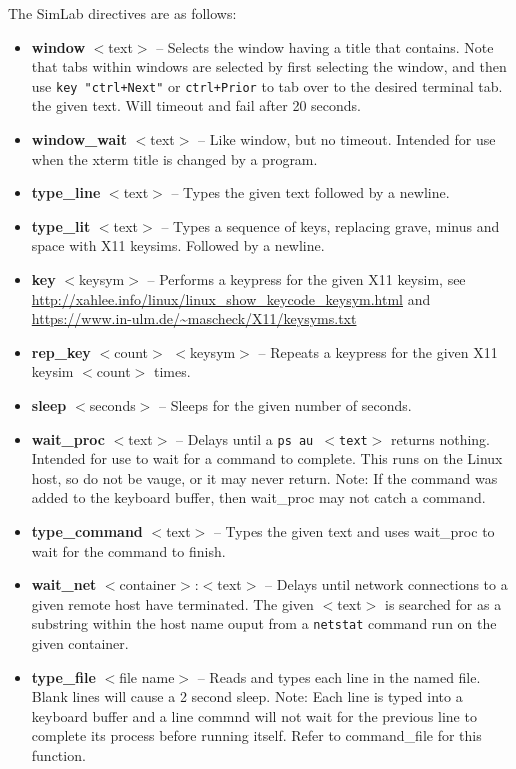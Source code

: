 \documentclass[12pt]{article}
\begin{document}
The SimLab directives are as follows:
\begin{itemize}
\item \textbf{window} $<$text$>$ -- Selects the window having a title that contains.  Note that
tabs within windows are selected by first selecting the window, and then use {\tt key "ctrl+Next"}
or {\tt ctrl+Prior} to tab over to the desired terminal tab.
the given text.  Will timeout and fail after 20 seconds.
\item \textbf{window\_wait} $<$text$>$ -- Like window, but no timeout.  Intended for
use when the xterm title is changed by a program.
\item \textbf{type\_line} $<$text$>$ -- Types the given text followed by a newline.
\item \textbf{type\_lit} $<$text$>$ -- Types a sequence of keys, replacing grave, minus and space with X11 keysims.
Followed by a newline.
\item \textbf{key} $<$keysym$>$ -- Performs a keypress for the given X11 keysim, see
\url{http://xahlee.info/linux/linux\_show\_keycode\_keysym.html} and 
\url{https://www.in-ulm.de/~mascheck/X11/keysyms.txt}
\item \textbf{rep\_key} $<$count$>$ $<$keysym$>$ -- Repeats a keypress for the given X11 keysim $<$count$>$ times.
\item \textbf{sleep} $<$seconds$>$ -- Sleeps for the given number of seconds.
\item \textbf{wait\_proc} $<$text$>$ -- Delays until a {\tt ps au $<$text$>$} returns nothing.
Intended for use to wait for a command to complete.  This runs on the Linux host, so
do not be vauge, or it may never return. 
Note: If the command was added to the keyboard buffer, then wait\_proc may not catch a command.
\item \textbf{type\_command} $<$text$>$ -- Types the given text and uses wait\_proc to wait for the command to finish.
\item \textbf{wait\_net} $<$container$>$:$<$text$>$ -- Delays until network connections to a given remote
host have terminated.  The given $<$text$>$ is searched for as a substring within the host name ouput
from a {\tt netstat} command run on the given container.
\item \textbf{type\_file} $<$file name$>$ -- Reads and types each line in the named file.
Blank lines will cause a 2 second sleep. Note: Each line is typed into a keyboard buffer and a line commnd will not wait for the previous line to complete its process before running itself. Refer to command\_file for this function.

\end{itemize}
\end{document}
